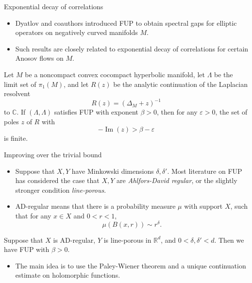 \documentclass[10pt]{beamer}
\newcommand{\RR}{\mathbb{R}}
\newcommand{\CC}{\mathbb{C}}
\renewcommand{\Im}{\operatorname{Im}}
\begin{document}
\begin{frame}{Exponential decay of correlations}
\begin{itemize}
\item Dyatlov and coauthors introduced FUP to obtain spectral gaps for elliptic operators on negatively curved manifolds $M$. \pause
\item Such results are closely related to exponential decay of correlations for certain Anosov flows on $M$. \pause
\end{itemize}

\begin{theorem}
Let $M$ be a noncompact convex cocompact hyperbolic manifold, let $\Lambda$ be the limit set of $\pi_1(M)$, and let $R(z)$ be the analytic continuation of the Laplacian resolvent
$$R(z) = (\Delta_M + z)^{-1}$$
to $\CC$. If $(\Lambda, \Lambda)$ satisfies FUP with exponent $\beta > 0$, then for any $\varepsilon > 0$, the set of poles $z$ of $R$ with
$$-\Im(z) > \beta - \varepsilon$$
is finite.
\end{theorem}
\end{frame}

\begin{frame}{Improving over the trivial bound}
\begin{itemize}
\item Suppose that $X, Y$ have Minkowski dimensions $\delta, \delta'$. Most literature on FUP has considered the case that $X, Y$ are \emph{Ahlfors-David regular}, or the slightly stronger condition \emph{line-porous}. \pause
\item AD-regular means that there is a probability measure $\mu$ with support $X$, such that for any $x \in X$ and $0 < r < 1$,
$$\mu(B(x, r)) \sim r^\delta.$$ \pause
\end{itemize}

\begin{theorem}
Suppose that $X$ is AD-regular, $Y$ is line-porous in $\RR^d$, and $0 < \delta, \delta' < d$. Then we have FUP with $\beta > 0$.
\end{theorem} \pause 

\begin{itemize}
\item The main idea is to use the Paley-Wiener theorem and a unique continuation estimate on holomorphic functions.
\end{itemize}
\end{frame}
\end{document}
